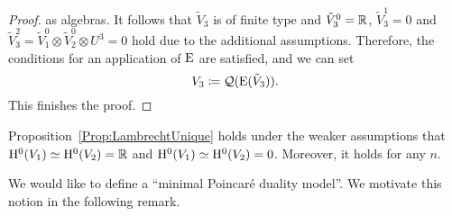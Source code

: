 \documentclass[\MainFolder/Text.tex]{subfiles}
\begin{document}
\begin{proof}
as algebras. It follows that $\tilde{V}_3$ is of finite type and $\tilde{V}_3^0 = \mathbb{R}$, $\tilde{V}_3^1 = 0$ and $\tilde{V}_3^2 = \tilde{V}_1^0 \otimes \tilde{V}_2^0 \otimes U^{3} = 0$ hold due to the additional assumptions. Therefore, the conditions for an application of $\mathrm{E}$ are satisfied, and we can set
$$ V_3\coloneqq \mathcal{Q}(\mathrm{E}(\tilde{V}_3)). $$
This finishes the proof.
%
%
\end{proof}

\begin{Conjecture}\label{Conj:PDGALST}
Proposition~\ref{Prop:LambrechtUnique} holds under the weaker assumptions that $\mathrm{H}^0(V_1)\simeq \mathrm{H}^0(V_2) = \mathbb{R}$ and $\mathrm{H}^0(V_1)\simeq\mathrm{H}^0(V_2) = 0$. Moreover, it holds for any $n$.
\end{Conjecture}

We would like to define a ``minimal Poincar\'e duality model''. We motivate this notion in the following remark.
\end{document}
